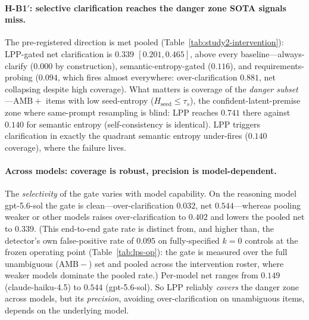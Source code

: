 \documentclass[acmsmall,screen,nonacm]{acmart}
\newcommand{\Hseed}{\ensuremath{H_{\mathrm{seed}}}}
\begin{document}
\paragraph{H-B1$'$: selective clarification reaches the danger zone SOTA signals miss.} The pre-registered
direction is met pooled (Table~\ref{tab:study2-intervention}): LPP-gated net clarification is
\textbf{$0.339$ $[0.201, 0.465]$}, above every baseline---always-clarify ($0.000$ by construction),
semantic-entropy-gated ($0.116$), and requirements-probing ($0.094$, which fires almost everywhere:
over-clarification $0.881$, net collapsing despite high coverage). What matters is coverage of the
\emph{danger subset}---$\mathrm{AMB}{+}$ items with low seed-entropy ($\Hseed\!\le\!\tau_s$), the
confident-latent-premise zone where same-prompt resampling is blind: LPP reaches \textbf{$0.741$} there
against \textbf{$0.140$} for semantic entropy (self-consistency is identical). LPP triggers clarification in
exactly the quadrant semantic entropy under-fires ($0.140$ coverage), where the failure lives.

\paragraph{Across models: coverage is robust, precision is model-dependent.} The
\emph{selectivity} of the gate varies with model capability. On the reasoning model gpt-5.6-sol the gate is
clean---over-clarification $0.032$, net $0.544$---whereas pooling weaker or other models raises
over-clarification to $0.402$ and lowers the pooled net to $0.339$. (This end-to-end gate rate is distinct
from, and higher than, the detector's own false-positive rate of $0.095$ on fully-specified $k{=}0$ controls
at the frozen operating point (Table~\ref{tab:lps-op}): the gate is measured over the full unambiguous
($\mathrm{AMB}{-}$) set and pooled across the intervention roster, where weaker models dominate the pooled
rate.) Per-model net ranges from $0.149$
(claude-haiku-4.5) to $0.544$ (gpt-5.6-sol). So LPP reliably \emph{covers} the danger zone across models,
but its \emph{precision}, avoiding over-clarification on unambiguous items, depends on the underlying
model.
\end{document}
